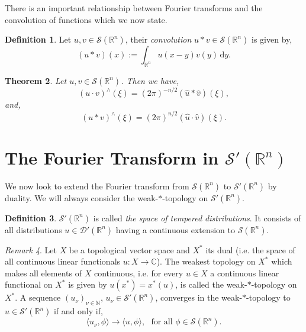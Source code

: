 \documentclass[a4paper, 12pt]{report}
\newtheorem{theorem}{Theorem}[section]
\theoremstyle{cor}
\theoremstyle{remark}
\newtheorem{remark}[theorem]{Remark}
\theoremstyle{definition}
\newtheorem{defn}[theorem]{Definition}
\begin{document}
There is an important relationship between Fourier transforms and the convolution of functions which we now state.
\begin{defn}
Let $u, v \in \mathcal{S}(\mathbb{R}^n)$, their \emph{convolution} $u\ast v \in \mathcal{S}(\mathbb{R}^n)$ is given by,
\begin{equation}
(u\ast v)(x) := \int_{\mathbb{R}^n}u(x - y)v(y)\,\mathrm{d}y.
\end{equation}
\end{defn}

\begin{theorem}
Let $u, v \in \mathcal{S}(\mathbb{R}^n)$.  Then we have,
\begin{equation}
(u\cdot v)^\wedge(\xi) = (2\pi)^{-n/2}(\hat{u}\ast\hat{v})(\xi),
\end{equation}
and,
\begin{equation}
(u\ast v)^\wedge(\xi) = (2\pi)^{n/2}(\hat{u}\cdot\hat{v})(\xi).
\end{equation}
\end{theorem}


\section{The Fourier Transform in $\mathcal{S}'(\mathbb{R}^n)$}

We now look to extend the Fourier transform from $\mathcal{S}(\mathbb{R}^n)$ to $\mathcal{S}'(\mathbb{R}^n)$ by duality.  We will always consider the weak-$\ast$-topology on $\mathcal{S}'(\mathbb{R}^n)$.
\begin{defn}
$\mathcal{S}'(\mathbb{R}^n)$ is called \emph{the space of tempered distributions}.  It consists of all distributions $u \in \mathcal{D}'(\mathbb{R}^n)$ having a continuous extension to $\mathcal{S}(\mathbb{R}^n)$.
\end{defn}
\begin{remark}
Let $X$ be a topological vector space and $X^\ast$ its dual (i.e. the space of all continuous linear functionals $u : X \to \mathbb{C}$).  The weakest topology on $X^\ast$ which makes all elements of $X$ continuous, i.e. for every $u \in X$ a continuous linear functional on $X^\ast$ is given by $u(x^\ast) = x^\ast(u)$, is called the weak-$\ast$-topology on $X^\ast$.  A sequence $(u_\nu)_{\nu \in \mathbb{N}}$, $u_\nu \in \mathcal{S}'(\mathbb{R}^n)$, converges in the weak-$\ast$-topology to $u \in \mathcal{S}'(\mathbb{R}^n)$ if and only if,
$$
\langle u_\nu, \phi\rangle \to \langle u, \phi\rangle, \,\,\,\, \text{for all } \phi \in \mathcal{S}(\mathbb{R}^n).
$$
\end{remark}
\end{document}
